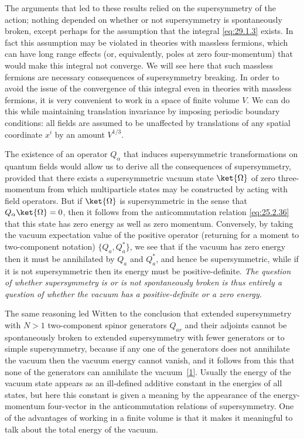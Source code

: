 The arguments that led to these results relied on the supersymmetry of the
action; nothing depended on whether or not supersymmetry is spontaneously
broken, except perhaps for the assumption that the integral
\eqref{eq:29.1.3} exists. In fact this assumption may be violated in
theories with massless fermions, which can have long range effects (or,
equivalently, poles at zero four-momentum) that would make this integral
not converge. We will see here that such massless fermions are necessary
consequences of supersymmetry breaking. In order to avoid the issue of the
convergence of this integral even in theories with massless fermions, it is
very convenient to work in a space of finite volume \(V\). We can do this
while maintaining translation invariance by imposing periodic boundary
conditions: all fields are assumed to be unaffected by translations of any
spatial coordinate \(x^i\) by an amount \(V^{1/3}\).

The existence of an operator \(Q_\alpha\) that induces supersymmetric
transformations on quantum fields would allow us to derive all the
consequences of supersymmetry, provided that there exists a supersymmetric
vacuum state \(\ket{\Omega}\) of zero three-momentum from which
multiparticle states may be constructed by acting with field operators.
But if \(\ket{\Omega}\) is supersymmetric in the sense that
\(Q_\alpha\ket{\Omega}=0\), then it follows from the anticommutation
relation \eqref{eq:25.2.36} that this state has zero energy as well as zero
momentum. Conversely, by taking the vacuum expectation value of the
positive operator (returning for a moment to two-component notation)
\(\{Q_a,Q_a^*\}\), we see that if the vacuum has zero energy then it must
be annihilated by \(Q_a\) and \(Q_a^*\), and hence be supersymmetric, while
if it is not supersymmetric then its energy must be positive-definite.
\emph{The question of whether supersymmetry is or is not spontaneously
broken is thus entirely a question of whether the vacuum has a
positive-definite or a zero energy.}

The same reasoning led Witten to the conclusion that extended
supersymmetry with \(N>1\) two-component spinor generators \(Q_{ar}\) and
their adjoints cannot be spontaneously broken to extended supersymmetry
with fewer generators or to simple supersymmetry, because if any one of
the generators does not annihilate the vacuum then the vacuum energy
cannot vanish, and it follows from this that none of the generators can
annihilate the vacuum~\hyperref[ch29-ref-1]{[1]}. Usually the energy of the
vacuum state appears as an ill-defined additive constant in the energies
of all states, but here this constant is given a meaning by the appearance
of the energy-momentum four-vector in the anticommutation relations of
supersymmetry. One of the advantages of working in a finite volume is that
it makes it meaningful to talk about the total energy of the vacuum.

